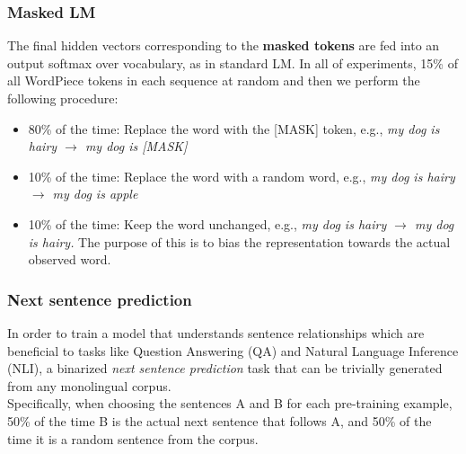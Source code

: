 \documentclass[a3paper, 12pt]{book} %
\begin{document}
\subsubsection{Masked LM}
The final hidden vectors corresponding to the \textbf{masked tokens} are fed into an output softmax over vocabulary, as in standard LM. In all of experiments, 15\% of all WordPiece tokens in each sequence at random and then we perform the following procedure:
\begin{itemize}
	\item 80\% of the time: Replace the word with the [MASK] token, e.g., \emph{my dog is hairy $\to$ my dog is [MASK]}
	\item 10\% of the time: Replace the word with a random word, e.g., \emph{my dog is hairy $\to$ my dog is apple}
	\item 10\% of the time: Keep the word unchanged, e.g., \emph{my dog is hairy $\to$ my dog is hairy.} The purpose of this is to bias the representation towards the actual observed word.
\end{itemize}

\subsubsection{Next sentence prediction}
In order to train a model that understands sentence relationships which are beneficial to tasks like Question Answering (QA) and Natural Language Inference (NLI), a binarized \emph{next sentence prediction} task that can be trivially generated from any monolingual corpus. \\

Specifically, when choosing the sentences A and B for each pre-training example, 50\% of the time B is the actual next sentence that follows A, and 50\% of the time it is a random sentence from the corpus. 
\end{document}
